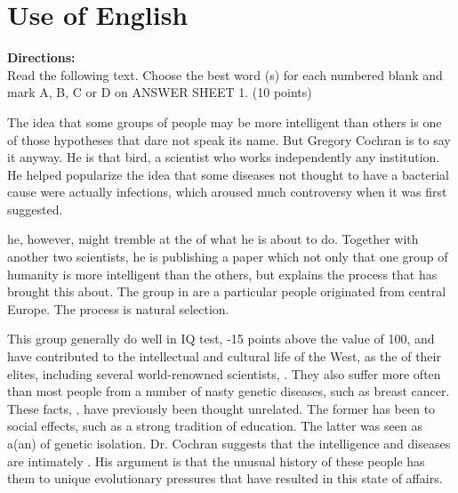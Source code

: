 







\section{Use of English}

\noindent
\textbf{Directions:}\\
Read the following text. Choose the best word (s) for each
	numbered blank and mark A, B, C or D on ANSWER
	SHEET 1. (10 points)
	
	
\TiGanSpace	
	

The idea that some groups of people may be more intelligent than others
is one of those hypotheses that dare not speak its name. But Gregory
Cochran is \cloze to say it anyway. He is
that \cloze bird, a scientist who works
independently \cloze any institution. He helped popularize the
idea that some diseases not \cloze thought to have a bacterial
cause were actually infections, which aroused much controversy when it
was first suggested.

\cloze he, however, might tremble at the \cloze of what he
is about to do. Together with another two scientists, he is publishing a
paper which not only \cloze that one group of humanity is more
intelligent than the others, but explains the process that has brought
this about. The group in \cloze are a particular people originated
from central Europe. The process is natural selection.

This group generally do well in IQ test, -15 points
above the \cloze value of 100, and have
contributed \cloze to the intellectual and cultural life of the
West, as the \cloze of their elites, including several
world-renowned scientists, \cloze. They also suffer more often
than most people from a number of nasty genetic diseases, such as breast
cancer. These facts, \cloze , have previously been thought
unrelated. The former has been \cloze to social effects, such as
a strong tradition of \cloze education. The latter was seen as a(an) \cloze of genetic isolation. Dr. Cochran suggests that the
intelligence and diseases are intimately \cloze. His argument
is that the unusual history of these people has \cloze them to
unique evolutionary pressures that have resulted in
this \cloze state of affairs.



\newpage

